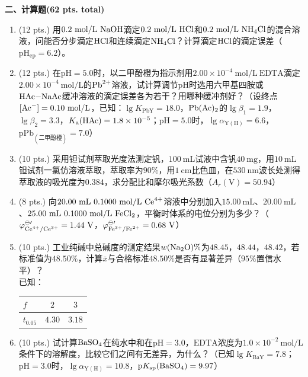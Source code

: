 \vspace{0.5cm}
\noindent\textbf{二、计算题(62 pts. total)}

\begin{enumerate}[label=\arabic*., itemsep=1.5ex]
    \item (12 pts.) 用$0.2\ \mathrm{mol/L}\ \ce{NaOH}$滴定$0.2\ \mathrm{mol/L}\ \ce{HCl}$和$0.2\ \mathrm{mol/L}\ \ce{NH4Cl}$的混合溶液，问能否分步滴定$\ce{HCl}$和连续滴定$\ce{NH4Cl}$？计算滴定$\ce{HCl}$的滴定误差（$\mathrm{pH_{ep}}=6.2$）。
    \item (12 pts.) 在$\mathrm{pH}=5.0$时，以二甲酚橙为指示剂用$2.00\times10^{-4}\ \mathrm{mol/L}\ \mathrm{EDTA}$滴定$2.00\times10^{-4}\ \mathrm{mol/L}$的$\ce{Pb^{2+}}$溶液，试计算调节$\mathrm{pH}$时选用六甲基四胺或$\ce{HAc-NaAc}$缓冲溶液的滴定误差各为若干？用哪种缓冲剂好？（设终点$[\ce{Ac^-}]=0.10\ \mathrm{mol/L}$，已知：$\lg K_{\mathrm{PbY}}=18.0$，$\ce{Pb(Ac)2}$的$\lg\beta_1=1.9$，$\lg\beta_2=3.3$，$K_\mathrm{a}(\ce{HAc})=1.8\times10^{-5}$；$\mathrm{pH}=5.0$时，$\lg\alpha_{\mathrm{Y(H)}}=6.6$，$\mathrm{pPb_{(二甲酚橙)}}=7.0$）
    \item (10 pts.) 采用钽试剂萃取光度法测定钒，$100\ \mathrm{mL}$试液中含钒$40\ \mathrm{mg}$，用$10\ \mathrm{mL}$钽试剂一氯仿溶液萃取，萃取率为$90\%$，用$1\ \mathrm{cm}$比色皿，在$530\ \mathrm{nm}$波长处测得萃取液的吸光度为$0.384$，求分配比和摩尔吸光系数（$A_r(\mathrm{V})=50.94$）
    \item (8 pts.) 向$20.00\ \mathrm{mL}\ 0.1000\ \mathrm{mol/L}\ \ce{Ce^{4+}}$溶液中分别加入$15.00\ \mathrm{mL}$、$20.00\ \mathrm{mL}$、$25.00\ \mathrm{mL}\ 0.1000\ \mathrm{mol/L}\ \ce{FeCl2}$，平衡时体系的电位分别为多少？（$\varphi^{\ominus\prime}_{\ce{Ce^{4+}/Ce^{3+}}}=1.44\ \mathrm{V}$，$\varphi^{\ominus\prime}_{\ce{Fe^{3+}/Fe^{2+}}}=0.68\ \mathrm{V}$）
    \item (10 pts.) 工业纯碱中总碱度的测定结果$w(\ce{Na2O})\%$为$48.45$，$48.44$，$48.42$，若标准值为$48.50\%$，计算$\bar{x}$与合格标准$48.50\%$是否有显著差异（$95\%$置信水平）？
    \\
    已知：
    \begin{center}
    \begin{tabular}{l|cc}
    $f$ & $2$ & $3$ \\
    \hline
    $t_{0.05}$ & $4.30$ & $3.18$ \\
    \end{tabular}
    \end{center}
    \item (10 pts.) 试计算$\ce{BaSO4}$在纯水中和在$\mathrm{pH}=3.0$，$\mathrm{EDTA}$浓度为$1.0\times10^{-2}\ \mathrm{mol/L}$条件下的溶解度，比较它们之间有无差异，为什么？（已知$\lg K_{\mathrm{BaY}}=7.8$；$\mathrm{pH}=3.0$时，$\lg\alpha_{\mathrm{Y(H)}}=10.8$，$\mathrm{p}K_{\mathrm{sp}}(\ce{BaSO4})=9.97$）
\end{enumerate}